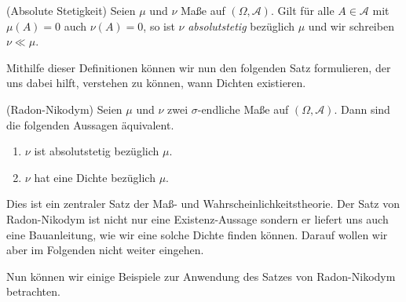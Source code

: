 \begin{Definition}{(Absolute Stetigkeit)}
Seien $\mu$ und $\nu$ Maße auf $(\Omega, \mathscr{A})$. Gilt für alle $A \in \mathscr{A}$ mit $\mu(A) = 0$ auch $\nu(A) = 0$, so ist $\nu$ \textit{absolutstetig} bezüglich $\mu$ und wir schreiben $\nu \ll \mu$.
\end{Definition}

Mithilfe dieser Definitionen können wir nun den folgenden Satz formulieren, der uns dabei hilft, verstehen zu können, wann Dichten existieren.

\begin{Satz}{(Radon-Nikodym)}
\hypertarget{Satz:Radon-Nikodym}{}Seien $\mu$ und $\nu$ zwei $\sigma$-endliche Maße auf $(\Omega, \mathscr{A})$. Dann sind die folgenden Aussagen äquivalent.
\begin{enumerate}[label=\textup{(\roman*)}]
\item $\nu$ ist absolutstetig bezüglich $\mu$.
\item $\nu$ hat eine Dichte bezüglich $\mu$.
\end{enumerate}
\end{Satz}


Dies ist ein zentraler Satz der Maß- und Wahrscheinlichkeitstheorie. Der Satz von Radon-Nikodym ist nicht nur eine Existenz-Aussage sondern er liefert uns auch eine \glqq Bauanleitung\grqq{}, wie wir eine solche Dichte finden können. Darauf wollen wir aber im Folgenden nicht weiter eingehen.

\newpage
Nun können wir einige Beispiele zur Anwendung des Satzes von Radon-Nikodym betrachten.

